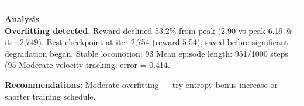 \documentclass[a4paper,10pt]{article}
\begin{document}
\vspace{2pt}
\hrule
\vspace{2pt}

\footnotesize
\textbf{Analysis} \\[1pt]
\textbf{Overfitting detected.} Reward declined 53.2\% from peak (2.90 vs peak 6.19 @ iter 2,749).
Best checkpoint at iter 2,754 (reward 5.54), saved before significant degradation began.
Stable locomotion: 93%
Mean episode length: 951/1000 steps (95%
Moderate velocity tracking: error = 0.414.

\textbf{Recommendations:}
Moderate overfitting --- try entropy bonus increase or shorter training schedule.
\end{document}
